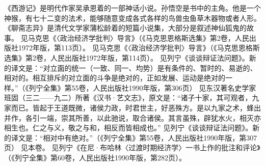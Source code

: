 \begin{maonote}
《西游记》是明代作家吴承恩着的一部神话小说。孙悟空是书中的主角。他是一个神猴，有七十二变的法术，能够随意变成各式各样的鸟兽虫鱼草木器物或者人形。
《聊斋志异》是清代文学家蒲松龄着的短篇小说集，大部分是叙述神仙狐鬼的故事。
见马克思《〈政治经济学批判〉导言》（《马克思恩格斯选集》第2卷，人民出版社1972年版，第113页）。
见马克思《〈政治经济学批判〉导言》（《马克思恩格斯选集》第2卷，人民出版社1972年版，第114页）。
见列宁《谈谈辩证法问题》。新的译文是：“对立面的统一（一致、同一、均势）是有条件的、暂时的、易逝的、相对的。相互排斥的对立面的斗争是绝对的，正如发展、运动是绝对的一样。”（《列宁全集》第55卷，人民出版社1990年版，第306页）
见东汉著名史学家班固（三二——九二）所著《汉书·艺文志》，原文是：“诸子十家，其可观者，九家而已。皆起于王道既微，诸侯力政，时君世主，好恶殊方。是以九家之术，蜂出并作，各引一端，崇其所善，以此驰说，取合诸侯。其言虽殊，辟犹水火，相灭亦相生也。仁之与义，敬之与和，相反而皆相成也。”
见列宁《谈谈辩证法问题》。新的译文是：“相对中有绝对。”（《列宁全集》第55卷，人民出版社1990年版，第307页）
见本卷。
见列宁《在尼·布哈林〈过渡时期经济学〉一书上作的批注和评论》（《列宁全集》第60卷，人民出版社1990年版，第282页）。
\end{maonote}
